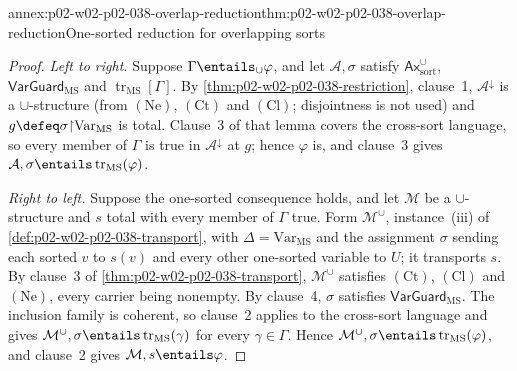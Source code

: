 \begin{annexitem}{annex:p02-w02-p02-038-overlap-reduction}{thm:p02-w02-p02-038-overlap-reduction}{One-sorted reduction for overlapping sorts}
\begin{proof}
\emph{Left to right.}  Suppose \(\Gamma\entails_{\cup}\varphi\), and let
\(\mathcal A,\sigma\) satisfy \(\mathsf{Ax}^{\cup}_{\mathrm{sort}}\),
\(\mathsf{VarGuard}_{\mathrm{MS}}\) and
\(\operatorname{tr}_{\mathrm{MS}}[\Gamma]\).  By
\cref{thm:p02-w02-p02-038-restriction}, clause~1, \(\mathcal A^{\downarrow}\)
is a \(\cup\)-structure (from \((\mathrm{Ne})\), \((\mathrm{Ct})\) and
\((\mathrm{Cl})\); disjointness is not used) and
\(g\defeq\sigma{\restriction}\mathrm{Var}_{\mathrm{MS}}\) is total.  Clause~3
of that lemma covers the cross-sort language, so every member of \(\Gamma\)
is true in \(\mathcal A^{\downarrow}\) at \(g\); hence \(\varphi\) is, and
clause~3 gives \(\mathcal A,\sigma\entails\operatorname{tr}_{\mathrm{MS}}(\varphi)\).

\emph{Right to left.}  Suppose the one-sorted consequence holds, and let
\(\mathcal M\) be a \(\cup\)-structure and \(s\) total with every member of
\(\Gamma\) true.  Form \(\mathcal M^{\cup}\), instance~(iii) of
\cref{def:p02-w02-p02-038-transport}, with \(\Delta=\mathrm{Var}_{\mathrm{MS}}\)
and the assignment \(\sigma\) sending each sorted \(v\) to \(s(v)\) and every
other one-sorted variable to \(U\); it transports \(s\).  By clause~3 of
\cref{thm:p02-w02-p02-038-transport}, \(\mathcal M^{\cup}\) satisfies
\((\mathrm{Ct})\), \((\mathrm{Cl})\) and \((\mathrm{Ne})\), every carrier being
nonempty.  By clause~4, \(\sigma\) satisfies
\(\mathsf{VarGuard}_{\mathrm{MS}}\).  The inclusion family is coherent, so
clause~2 applies to the cross-sort language and gives
\(\mathcal M^{\cup},\sigma\entails\operatorname{tr}_{\mathrm{MS}}(\gamma)\) for
every \(\gamma\in\Gamma\).  Hence
\(\mathcal M^{\cup},\sigma\entails\operatorname{tr}_{\mathrm{MS}}(\varphi)\), and
clause~2 gives \(\mathcal M,s\entails\varphi\).
\end{proof}
\end{annexitem}

